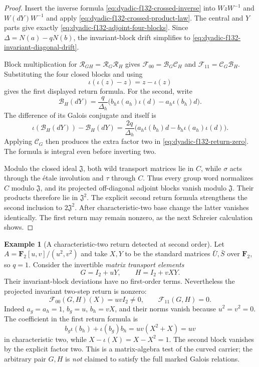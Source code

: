 \documentclass[11pt]{article}
\theoremstyle{definition}
\newtheorem{example}[theorem]{Example}
\begin{document}
\begin{proof}
Insert the inverse formula
\eqref{eq:dyadic-f132-crossed-inverse}
into $WzW^{-1}$ and
$W(dY)W^{-1}$ and apply
\eqref{eq:dyadic-f132-crossed-product-law}.
The central and $Y$ parts
give exactly
\eqref{eq:dyadic-f132-adjoint-four-blocks}.
Since $\Delta=N(a)-qN(b)$,
the invariant-block drift
simplifies to
\eqref{eq:dyadic-f132-invariant-diagonal-drift}.

Block multiplication for
$\mathcal R_{GH}
=\mathcal R_G\mathcal R_H$
gives
$\mathscr F_{00}=\mathcal B_G\mathcal C_H$
and
$\mathscr F_{11}=\mathcal C_G\mathcal B_H$.
Substituting the four
closed blocks and using
\[
\iota(\iota(z)-z)=z-\iota(z)
\]
gives the first displayed
return formula.
For the second, write
\[
\mathcal B_H(dY)
=\frac{q}{\Delta_h}
\bigl(b_h\iota(a_h)\iota(d)
       -a_h\iota(b_h)d\bigr).
\]
The difference of its
Galois conjugate and itself is
\[
\iota(\mathcal B_H(dY))
-\mathcal B_H(dY)
=\frac{2q}{\Delta_h}
\bigl(a_h\iota(b_h)d
      -b_h\iota(a_h)\iota(d)\bigr).
\]
Applying $\mathcal C_G$
then produces the
extra factor two in
\eqref{eq:dyadic-f132-return-zero}.
The formula is integral
even before inverting two.

Modulo the closed ideal
$\mathfrak J$, both wild
transport matrices lie in
$C$, while $\sigma$ acts
through the \'etale involution
and $\tau$ through $C$.
Thus every group word
normalizes $C$ modulo
$\mathfrak J$, and its
projected off-diagonal
adjoint blocks vanish
modulo $\mathfrak J$.
Their products therefore
lie in $\mathfrak J^2$.
The explicit second
return formula strengthens
the second inclusion to
$2\mathfrak J^2$.
After characteristic-two
base change the latter
vanishes identically.
The first return may remain
nonzero, as the next
Schreier calculation shows.
\end{proof}

\begin{example}[A characteristic-two return detected at second order]
\label{ex:dyadic-f132-char2-second-return}
Let
$A=\mathbf F_2[u,v]/(u^2,v^2)$
and take $X,Y$ to be the
standard matrices
$\bar U,\bar S$ over $\mathbf F_2$,
so $q=1$.
Consider the invertible
\emph{matrix transport
elements}
\[
G=I_2+uY,\qquad
H=I_2+vXY.
\]
Their invariant-block
deviations have no
first-order terms.
Nevertheless the
projected invariant
two-step return
is nonzero:
\begin{equation}\label{eq:dyadic-f132-char2-nonzero-return}
\boxed{\qquad
\mathscr F_{00}(G,H)(X)
=uv I_2\ne0,\qquad
\mathscr F_{11}(G,H)=0.
\qquad}
\end{equation}
Indeed $a_g=a_h=1$,
$b_g=u$, $b_h=vX$,
and their norms
vanish because
$u^2=v^2=0$.
The coefficient in
the first return
formula is
\[
b_g\iota(b_h)+
\iota(b_g)b_h
=uv(X^2+X)=uv
\]
in characteristic
two, while
$X-\iota(X)=X-X^2=1$.
The second block
vanishes by the
explicit factor two.
This is a
matrix-algebra
test of the curved
carrier; the
arbitrary pair
$G,H$ is \emph{not}
claimed to satisfy
the full marked
Galois relations.
\end{example}
\end{document}
